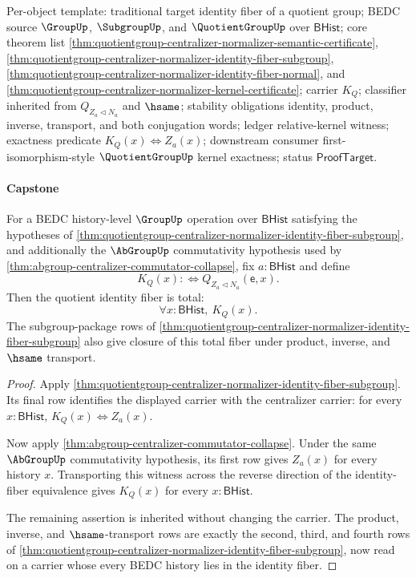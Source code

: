 Per-object template: traditional target identity fiber of a quotient group;
BEDC source $\GroupUp$, $\SubgroupUp$, and $\QuotientGroupUp$ over
$\mathsf{BHist}$; core theorem list
\autoref{thm:quotientgroup-centralizer-normalizer-semantic-certificate},
\autoref{thm:quotientgroup-centralizer-normalizer-identity-fiber-subgroup},
\autoref{thm:quotientgroup-centralizer-normalizer-identity-fiber-normal}, and
\autoref{thm:quotientgroup-centralizer-normalizer-kernel-certificate}; carrier
$K_Q$; classifier inherited from $Q_{Z_a\triangleleft N_a}$ and $\hsame$;
stability obligations identity, product, inverse, transport, and both
conjugation words; ledger relative-kernel witness; exactness predicate
$K_Q(x)\Longleftrightarrow Z_a(x)$; downstream consumer first-isomorphism-style
$\QuotientGroupUp$ kernel exactness; status $\mathsf{ProofTarget}$.

\paragraph{Capstone}

\begin{theorem}
\label{thm:abelian-centralizer-normalizer-quotient-terminal-fiber}
For a BEDC history-level $\GroupUp$ operation over $\mathsf{BHist}$ satisfying
the hypotheses of
\autoref{thm:quotientgroup-centralizer-normalizer-identity-fiber-subgroup},
and additionally the $\AbGroupUp$ commutativity hypothesis used by
\autoref{thm:abgroup-centralizer-commutator-collapse}, fix
$a:\mathsf{BHist}$ and define
$$
K_Q(x) :\Longleftrightarrow Q_{Z_a\triangleleft N_a}(\mathsf{e},x).
$$
Then the quotient identity fiber is total:
$$
\forall x:\mathsf{BHist},\ K_Q(x).
$$
The subgroup-package rows of
\autoref{thm:quotientgroup-centralizer-normalizer-identity-fiber-subgroup}
also give closure of this total fiber under product, inverse, and $\hsame$
transport.
\end{theorem}
\begin{proof}
Apply
\autoref{thm:quotientgroup-centralizer-normalizer-identity-fiber-subgroup}.
Its final row identifies the displayed carrier with the centralizer carrier:
for every $x:\mathsf{BHist}$, $K_Q(x)\Longleftrightarrow Z_a(x)$.

Now apply \autoref{thm:abgroup-centralizer-commutator-collapse}. Under the
same $\AbGroupUp$ commutativity hypothesis, its first row gives $Z_a(x)$ for
every history $x$. Transporting this witness across the reverse direction of
the identity-fiber equivalence gives $K_Q(x)$ for every $x:\mathsf{BHist}$.

The remaining assertion is inherited without changing the carrier. The product,
inverse, and $\hsame$-transport rows are exactly the second, third, and fourth
rows of
\autoref{thm:quotientgroup-centralizer-normalizer-identity-fiber-subgroup},
now read on a carrier whose every BEDC history lies in the identity fiber.
\end{proof}

